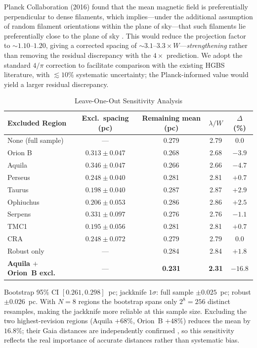 \documentclass[twoside,twocolumn]{mnras}
\begin{document}
Planck Collaboration (2016) found that the mean magnetic field is preferentially
perpendicular to dense filaments, which implies---under the additional assumption of
random filament orientations within the plane of sky---that such filaments lie
preferentially close to the plane of sky \citep{Planck2016}. This would reduce the
projection factor to ${\sim}1.10$--$1.20$, giving a corrected spacing of
${\sim}3.1$--$3.3\times W$---\textit{strengthening} rather than removing the residual
discrepancy with the $4\times$ prediction. We adopt the standard $4/\pi$ correction
to facilitate comparison with the existing HGBS literature, with $\lesssim10\%$
systematic uncertainty; the Planck-informed value would yield a larger residual discrepancy.

\begin{table}[h]
\caption{Leave-One-Out Sensitivity Analysis}
\label{tab:leave_one_out}
\begin{tabular}{lcccc}
\toprule
Excluded Region & Excl.\ spacing (pc) & Remaining mean (pc) & $\lambda/W$ & $\Delta$ (\%) \\
\midrule
None (full sample) & --- & 0.279 & 2.79 & 0.0 \\
Orion B & $0.313 \pm 0.047$ & 0.268 & 2.68 & $-3.9$ \\
Aquila & $0.346 \pm 0.047$ & 0.266 & 2.66 & $-4.7$ \\
Perseus & $0.248 \pm 0.040$ & 0.281 & 2.81 & $+0.7$ \\
Taurus & $0.198 \pm 0.040$ & 0.287 & 2.87 & $+2.9$ \\
Ophiuchus & $0.206 \pm 0.053$ & 0.286 & 2.86 & $+2.5$ \\
Serpens & $0.331 \pm 0.097$ & 0.276 & 2.76 & $-1.1$ \\
TMC1 & $0.195 \pm 0.056$ & 0.281 & 2.81 & $+0.7$ \\
CRA & $0.248 \pm 0.072$ & 0.279 & 2.79 & $0.0$ \\
\midrule
Robust only & --- & 0.284 & 2.84 & $+1.8$ \\
\textbf{Aquila $+$ Orion~B excl.} & --- & \textbf{0.231} & \textbf{2.31} & $\mathbf{-16.8}$ \\
\bottomrule
\end{tabular}
\vspace{2pt}
\footnotesize Bootstrap 95\% CI $[0.261, 0.298]$~pc; jackknife $1\sigma$: full sample $\pm 0.025$~pc; robust $\pm 0.026$~pc. With $N=8$ regions the bootstrap spans only $2^8=256$ distinct resamples, making the jackknife more reliable at this sample size. Excluding the two highest-revision regions (Aquila $+68\%$, Orion~B $+48\%$) reduces the mean by $16.8\%$; their Gaia distances are independently confirmed \citep{Yan2022,Green2024,Kounkel2018}, so this sensitivity reflects the real importance of accurate distances rather than systematic bias.
\end{table}
\end{document}
